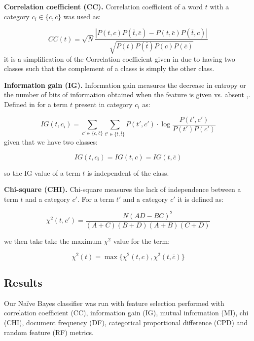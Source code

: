 \documentclass[10pt, a4paper]{article}
\begin{document}
\textbf{Correlation coefficient (CC).} Correlation coefficient of a word $t$ with a category $c_i \in \{c,\bar{c}\}$ was used as:

$$ CC(t) = \sqrt{N} \frac{| P(t,c)P(\bar{t},\bar{c}) - P(t,\bar{c})P(\bar{t},c) |}
				{\sqrt{P(t)P(\bar{t})P(c)P(\bar{c})}}
$$
it is a simplification of the Correlation coefficient given in \cite{IG} due to having two classes such that the complement of a classs is simply the other class.

\textbf{Information gain (IG).} Information gain measures the decrease in entropy or the number of bits of information obtained when the feature is given vs. absent \cite{Empirical},\cite{IG}. Defined in \cite{IG} for a term $t$ present in category $c_i$ as:

$$ IG(t,c_i) = \sum\limits_{c'\in\{ c,\bar{c} \}} \sum\limits_{t'\in\{ t,\bar{t} \}} P(t',c') \cdot \log \frac{P(t',c')}{P(t')P(c')} $$
given that we have two classes:

$$ IG(t,c_i) = IG(t,c) = IG(t,\bar{c}) $$

so the IG value of a term $t$ is independent of the class.

\textbf{Chi-square (CHI).} Chi-square measures the lack of independence between a term $t$ and a category $c'$. For a term $t'$ and a category $c'$ it is defined as:

$$\chi^2 (t,c') = \frac{N(AD-BC)^2}{(A+C)(B+D)(A+B)(C+D)}$$

we then take take the maximum $\chi^2$ value for the term:

$$\chi^2 (t) = \max\{\chi^2(t,c),\chi^2(t,\bar{c})\} $$

\subsection{Results}

Our Na\"ive Bayes classifier was run with feature selection performed with correlation coefficient (CC), information gain (IG), mutual information (MI), chi (CHI), document frequency (DF), categorical proportional difference (CPD) and random feature (RF) metrics.
\end{document}
